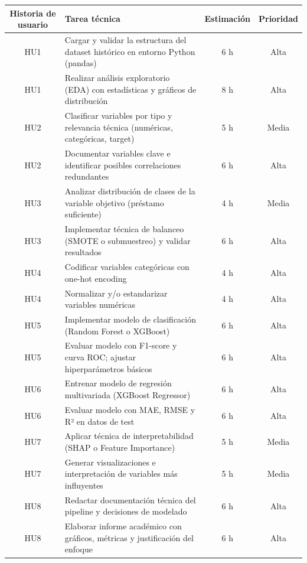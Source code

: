 \documentclass[
11pt, %
]{charter}
\begin{document}
\begin{table}[htpb]
\centering
\begin{tabularx}{\linewidth}{@{}|c|X|c|c|@{}}
\hline
\rowcolor[HTML]{C0C0C0}
Historia de usuario & Tarea técnica & Estimación & Prioridad \\ \hline

HU1 & Cargar y validar la estructura del dataset histórico en entorno Python (pandas) & 6 h & Alta \\ \hline
HU1 & Realizar análisis exploratorio (EDA) con estadísticas y gráficos de distribución & 8 h & Alta \\ \hline

HU2 & Clasificar variables por tipo y relevancia técnica (numéricas, categóricas, target) & 5 h & Media \\ \hline
HU2 & Documentar variables clave e identificar posibles correlaciones redundantes & 6 h & Alta \\ \hline

HU3 & Analizar distribución de clases de la variable objetivo (préstamo suficiente) & 4 h & Media \\ \hline
HU3 & Implementar técnica de balanceo (SMOTE o submuestreo) y validar resultados & 6 h & Alta \\ \hline

HU4 & Codificar variables categóricas con one-hot encoding & 4 h & Alta \\ \hline
HU4 & Normalizar y/o estandarizar variables numéricas & 4 h & Alta \\ \hline

HU5 & Implementar modelo de clasificación (Random Forest o XGBoost) & 6 h & Alta \\ \hline
HU5 & Evaluar modelo con F1-score y curva ROC; ajustar hiperparámetros básicos & 6 h & Alta \\ \hline

HU6 & Entrenar modelo de regresión multivariada (XGBoost Regressor) & 6 h & Alta \\ \hline
HU6 & Evaluar modelo con MAE, RMSE y R² en datos de test & 6 h & Alta \\ \hline

HU7 & Aplicar técnica de interpretabilidad (SHAP o Feature Importance) & 5 h & Media \\ \hline
HU7 & Generar visualizaciones e interpretación de variables más influyentes & 5 h & Media \\ \hline

HU8 & Redactar documentación técnica del pipeline y decisiones de modelado & 6 h & Alta \\ \hline
HU8 & Elaborar informe académico con gráficos, métricas y justificación del enfoque & 6 h & Alta \\ \hline


\end{tabularx}
\end{table}
\end{document}
